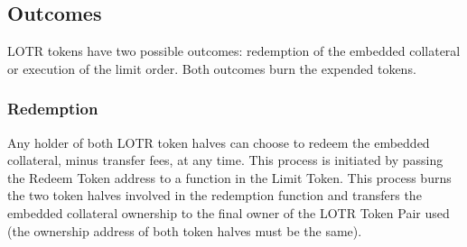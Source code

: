 \documentclass[12pt]{article}
\begin{document}
      \subsection{Outcomes}
         LOTR tokens have two possible outcomes: redemption of the embedded collateral or execution of the limit order. Both outcomes burn the expended tokens.
         \subsubsection{Redemption}
            Any holder of both LOTR token halves can choose to redeem the embedded collateral, minus transfer fees, at any time. This process is initiated by passing the Redeem Token address to a function in the Limit Token. This process burns the two token halves involved in the redemption function and transfers the embedded collateral ownership to the final owner of the LOTR Token Pair used (the ownership address of both token halves must be the same).
\end{document}
